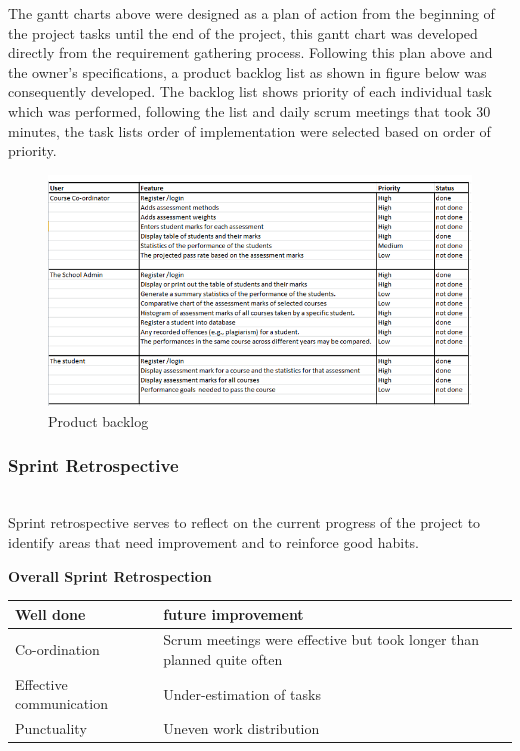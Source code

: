 \documentclass[10pt,onecolumn]{MainDocument}
\begin{document}
The gantt charts above were designed as a plan of action from the beginning of the project tasks until the end of the project, this gantt chart was developed directly from the requirement gathering process. Following this plan above and the owner's specifications, a product backlog list as shown in figure below was consequently developed. The backlog list shows priority of each individual task which was performed, following the list and daily scrum meetings that took 30 minutes, the task lists order of implementation were selected based on order of priority.      

\begin{center}
\begin{figure}[h]
\centering
\includegraphics[trim = {0 0cm 0cm 0cm},clip, scale=1]{product_backlog}
\caption{Product backlog}
\end{figure}
\end{center}

\newpage
\subsubsection{Sprint Retrospective}~\\

Sprint retrospective serves to reflect on the current progress of the project to identify areas that need improvement and to reinforce good habits.

\textbf{Overall Sprint Retrospection}

	\begin{tabular}{ | p{5cm} | p{4cm} | }
		\hline
		\textbf{Well done} & \textbf{future improvement}\\ \hline
		Co-ordination 	& Scrum meetings were effective but took longer than planned quite often\\ \hline	
		Effective communication& Under-estimation of tasks \\ \hline
		Punctuality & Uneven work distribution			
		\\ \hline
	\end{tabular}
	
\end{document}
